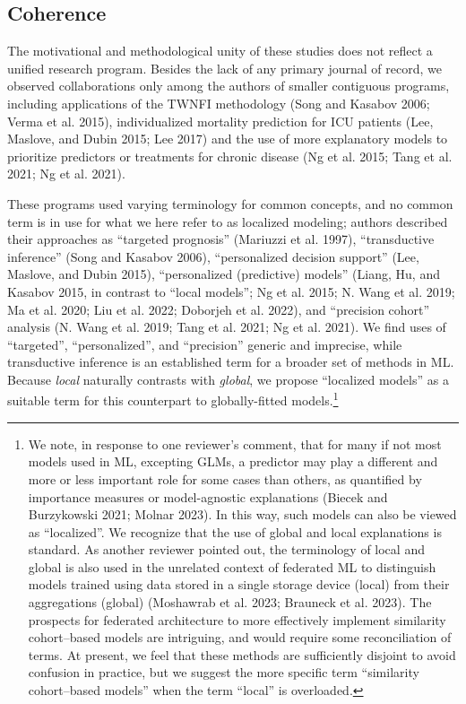 \documentclass{article}
\begin{document}
\hypertarget{coherence}{%
\subsection{Coherence}\label{coherence}}

The motivational and methodological unity of these studies does not
reflect a unified research program. Besides the lack of any primary
journal of record, we observed collaborations only among the authors of
smaller contiguous programs, including applications of the TWNFI
methodology (Song and Kasabov 2006; Verma et al. 2015), individualized
mortality prediction for ICU patients (Lee, Maslove, and Dubin 2015; Lee
2017) and the use of more explanatory models to prioritize predictors or
treatments for chronic disease (Ng et al. 2015; Tang et al. 2021; Ng et
al. 2021).

These programs used varying terminology for common concepts, and no
common term is in use for what we here refer to as localized modeling;
authors described their approaches as ``targeted prognosis'' (Mariuzzi
et al. 1997), ``transductive inference'' (Song and Kasabov 2006),
``personalized decision support'' (Lee, Maslove, and Dubin 2015),
``personalized (predictive) models'' (Liang, Hu, and Kasabov 2015, in
contrast to ``local models''; Ng et al. 2015; N. Wang et al. 2019; Ma et
al. 2020; Liu et al. 2022; Doborjeh et al. 2022), and ``precision
cohort'' analysis (N. Wang et al. 2019; Tang et al. 2021; Ng et al.
2021). We find uses of ``targeted'', ``personalized'', and ``precision''
generic and imprecise, while transductive inference is an established
term for a broader set of methods in ML. Because \emph{local} naturally
contrasts with \emph{global}, we propose ``localized models'' as a
suitable term for this counterpart to globally-fitted models.\footnote{We
  note, in response to one reviewer's comment, that for many if not most
  models used in ML, excepting GLMs, a predictor may play a different
  and more or less important role for some cases than others, as
  quantified by importance measures or model-agnostic explanations
  (Biecek and Burzykowski 2021; Molnar 2023). In this way, such models
  can also be viewed as ``localized''. We recognize that the use of
  global and local explanations is standard. As another reviewer pointed
  out, the terminology of local and global is also used in the unrelated
  context of federated ML to distinguish models trained using data
  stored in a single storage device (local) from their aggregations
  (global) (Moshawrab et al. 2023; Brauneck et al. 2023). The prospects
  for federated architecture to more effectively implement similarity
  cohort--based models are intriguing, and would require some
  reconciliation of terms. At present, we feel that these methods are
  sufficiently disjoint to avoid confusion in practice, but we suggest
  the more specific term ``similarity cohort--based models'' when the
  term ``local'' is overloaded.}
\end{document}
